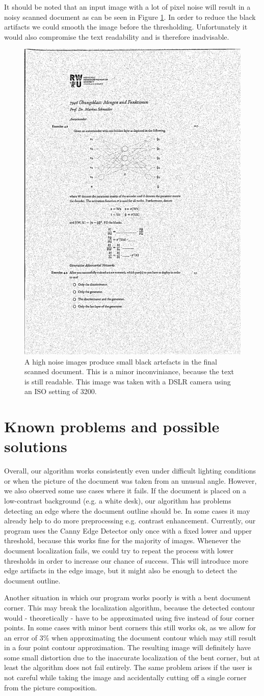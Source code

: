 \documentclass[bibliography=totoc]{scrartcl}
\begin{document}
It should be noted that an input image with a lot of pixel noise will result in a noisy scanned document as can be seen in Figure \ref{fig:noise}.
In order to reduce the black artifacts we could smooth the image before the thresholding.
Unfortunately it would also compromise the text readability and is therefore inadvisable.

\begin{figure}[H]
	\centering
	\includegraphics[width=0.25\linewidth]{imgs/threshold/noise.jpg}
	\caption{A high noise images produce small black artefacts in the final scanned document. This is a minor inconviniance, because the text is still readable. This image was taken with a \acs{DSLR} camera using an ISO setting of 3200.}
	\label{fig:noise}
\end{figure}

\section{Known problems and possible solutions}

Overall, our algorithm works consistently even under difficult lighting conditions or when the picture of the document was taken from an unusual angle.
However, we also observed some use cases where it fails.
If the document is placed on a low-contrast background (e.g. a white desk), our algorithm has problems detecting an edge where the document outline should be.
In some cases it may already help to do more preprocessing e.g. contrast enhancement.
Currently, our program uses the Canny Edge Detector only once with a fixed lower and upper threshold, because this works fine for the majority of images.
Whenever the document localization fails, we could try to repeat the process with lower thresholds in order to increase our chance of success.
This will introduce more edge artifacts in the edge image, but it might also be enough to detect the document outline.

Another situation in which our program works poorly is with a bent document corner.
This may break the localization algorithm, because the detected contour would - theoretically - have to be approximated using five instead of four corner points.
In some cases with minor bent corners this still works ok, as we allow for an error of 3\% when approximating the document contour which may still result in a four point contour approximation.
The resulting image will definitely have some small distortion due to the inaccurate localization of the bent corner, but at least the algorithm does not fail entirely.
The same problem arises if the user is not careful while taking the image and accidentally cutting off a single corner from the picture composition.
\end{document}

